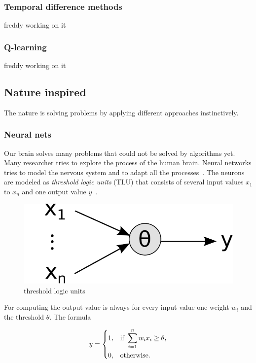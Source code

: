 \subsubsection{Temporal difference methods} 
freddy working on it
\subsubsection{Q-learning} 
freddy working on it

\subsection{Nature inspired} 
The nature is solving problems by applying different approaches instinctively. 

\subsubsection{Neural nets} 
Our brain solves many problems that could not be solved by algorithms yet. Many researcher tries to explore the process of the human brain. Neural networks tries to model the nervous system and to adapt all the processes~\cite{nn_intro}. The neurons are modeled as \textit{threshold logic units} (TLU) that consists of several input values $x_1$ to $x_n$ and one output value $y$~\cite{ci_kruse}. 


\begin{figure}
\centering
\includegraphics[scale=0.3]{images/tlu.pdf}
\caption{threshold logic units ~\cite{ci_kruse}}
\label{fig:tlu}
\end{figure}


For computing the output value is always for every input value one weight $w_i$ and the threshold $\theta$. The formula 

\begin{equation}
    y = 
\begin{dcases}
    1, & \text{if } \sum_{i=1}^n w_{i} x_{i} \geq \theta \text{,} \\
    0, & \text{otherwise.}
\end{dcases}
\end{equation}

